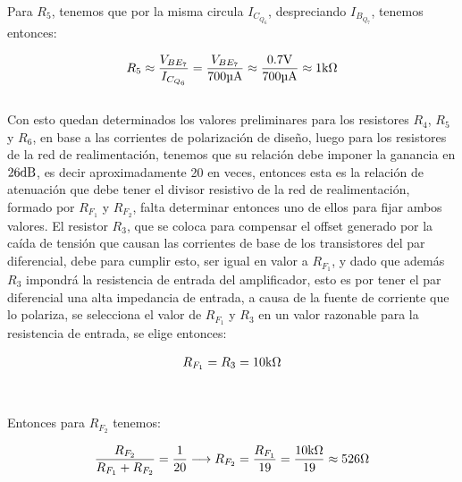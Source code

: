 Para $R_{5}$, tenemos que por la misma circula $I_{{C_{Q_{6}}}}$, despreciando $I_{{B_{Q_{7}}}}$, tenemos entonces:


\begin{equation*}
R_{5} \approx \frac{V_{BE_{7}}}{I_{{C_{Q_{6}}}}} = \frac{V_{BE_{7}}}{700 \si[per-mode=symbol]{\micro\ampere}} \approx \frac{0.7 \si[per-mode=symbol]{\volt}}{700 \si[per-mode=symbol]{\micro\ampere}} \approx 1 \si[per-mode=symbol]{\kilo\ohm}
\end{equation*}\\


Con esto quedan determinados los valores preliminares para los resistores $R_{4}$, $R_{5}$ y $R_{6}$, en base a las corrientes de polarización de diseño, luego para los resistores de la red de realimentación, tenemos que su relación debe imponer la ganancia en $26 \si[per-mode=symbol]{\decibel}$, es decir aproximadamente \num{20} en veces, entonces esta es la relación de atenuación que debe tener el divisor resistivo de la red de realimentación, formado por $R_{F_{1}}$ y $R_{F_{2}}$, falta determinar entonces uno de ellos para fijar ambos valores. El resistor $R_{3}$, que se coloca para compensar el offset generado por la caída de tensión que causan las corrientes de base de los transistores del par diferencial, debe para cumplir esto, ser igual en valor a $R_{F_{1}}$, y dado que además $R_{3}$ impondrá la resistencia de entrada del amplificador, esto es por tener el par diferencial una alta impedancia de entrada, a causa de la fuente de corriente que lo polariza, se selecciona el valor de $R_{F_{1}}$ y $R_{3}$ en un valor razonable para la resistencia de entrada, se elige entonces:

\begin{equation*}
R_{F_{1}} = R_{3} = 10 \si[per-mode=symbol]{\kilo\ohm}
\end{equation*}\\\\


Entonces para $R_{F_{2}}$ tenemos:


\begin{equation*}
\frac{R_{F_{2}}}{R_{F_{1}} + R_{F_{2}}} = \frac{1}{20} \longrightarrow R_{F_{2}} = \frac{R_{F_{1}}}{19} = \frac{10 \si[per-mode=symbol]{\kilo\ohm}}{19} \approx 526 \si[per-mode=symbol]{\ohm}
\end{equation*}\\\\

